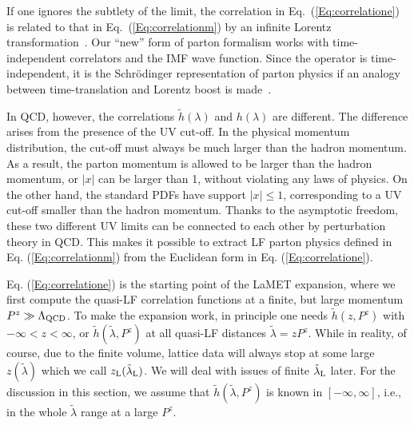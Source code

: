 If one ignores the subtlety of the limit,
the correlation in Eq.~(\ref{Eq:correlatione})
is related to that  in Eq.~(\ref{Eq:correlationm})
by an infinite Lorentz transformation~\cite{Ji:2013dva}.
Our ``new'' form of parton formalism works with time-independent
correlators and the IMF wave function.
Since the operator is time-independent, it is the
Schr\"odinger representation of parton physics
if an analogy between time-translation and Lorentz boost is
made~\cite{Ji:2020ect}.

In QCD, however, the correlations $\tilde h(\lambda)$
and $h(\lambda)$ are different. The difference arises
from the presence of the UV cut-off. In the physical
momentum distribution, the cut-off must always be much
larger than the hadron momentum. As a result, the parton momentum
is allowed to be larger than the hadron momentum, or $|x|$ can be
larger than 1, without
violating any laws of physics. On the other hand, the standard PDFs
have support $|x|\le1$, corresponding to a UV cut-off smaller than
the hadron momentum. Thanks
to the asymptotic freedom, these two different UV limits
can be connected to each other by perturbation theory in QCD. This makes it possible to extract LF parton physics defined in Eq. (\ref{Eq:correlationm}) from the Euclidean form in Eq. (\ref{Eq:correlatione}).

Eq. (\ref{Eq:correlatione}) is the starting point
of the LaMET expansion, where we first
compute the quasi-LF correlation functions at a finite,
but large momentum $P^z\gg\Lambda_{\rm QCD}$.
To make the expansion work, in principle one needs ${\tilde h}(z, P^z)$ with $-\infty<z<\infty$, or
${\tilde h}(\tilde \lambda, P^z)$ at all quasi-LF distances $\tilde \lambda=z P^z$.
While in reality, of course, due to
the finite volume, lattice data will always stop at some
large $z(\tilde \lambda)$ which we call $z_{\rm L}(\tilde \lambda_{\rm L})$. We will
deal with issues of finite $\tilde \lambda_{\rm L}$ later.
For the discussion in this section, we assume that $\tilde h(\tilde \lambda, P^z)$
is known in $[-\infty,\infty]$, i.e., in the whole $\tilde \lambda$ range at a large
$P^z$.

